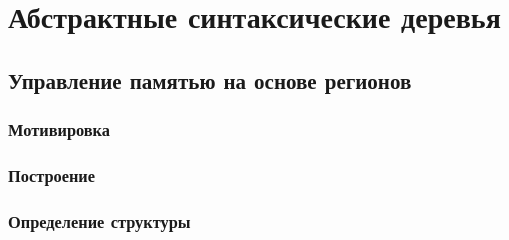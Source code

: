 \documentclass[bachelor, och, otchet]{SCWorks}
\begin{document}









\section{Абстрактные синтаксические деревья}
\subsection{Управление памятью на основе регионов}

\subsubsection{Мотивировка}


\subsubsection{Построение}


\subsubsection{Определение структуры}

\end{document}
